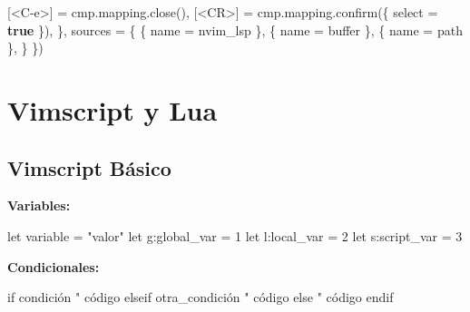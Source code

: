 \documentclass[
  doc,
  floatsintext,
  longtable,
  a4paper,
  nolmodern,
  notxfonts,
  notimes,
  12pt,
  colorlinks=true,linkcolor=blue,citecolor=blue,urlcolor=blue]{apa7}
\newenvironment{Shaded}{\begin{snugshade}}{\end{snugshade}}
\newcommand{\FunctionTok}[1]{\textcolor[rgb]{0.28,0.35,0.67}{#1}}
\newcommand{\KeywordTok}[1]{\textcolor[rgb]{0.00,0.23,0.31}{\textbf{#1}}}
\newcommand{\NormalTok}[1]{\textcolor[rgb]{0.00,0.23,0.31}{#1}}
\newcommand{\OperatorTok}[1]{\textcolor[rgb]{0.37,0.37,0.37}{#1}}
\newcommand{\StringTok}[1]{\textcolor[rgb]{0.13,0.47,0.30}{#1}}
\newcommand{\VariableTok}[1]{\textcolor[rgb]{0.07,0.07,0.07}{#1}}
\begin{document}
\begin{Shaded}
\begin{Highlighting}[]
        \OperatorTok{[}\StringTok{\textquotesingle{}\textless{}C{-}e\textgreater{}\textquotesingle{}}\OperatorTok{]} \OperatorTok{=} \VariableTok{cmp}\OperatorTok{.}\VariableTok{mapping}\OperatorTok{.}\NormalTok{close}\OperatorTok{(),}
        \OperatorTok{[}\StringTok{\textquotesingle{}\textless{}CR\textgreater{}\textquotesingle{}}\OperatorTok{]} \OperatorTok{=} \VariableTok{cmp}\OperatorTok{.}\VariableTok{mapping}\OperatorTok{.}\NormalTok{confirm}\OperatorTok{(\{} \FunctionTok{select} \OperatorTok{=} \KeywordTok{true} \OperatorTok{\}),}
    \OperatorTok{\},}
    \VariableTok{sources} \OperatorTok{=} \OperatorTok{\{}
        \OperatorTok{\{} \VariableTok{name} \OperatorTok{=} \StringTok{\textquotesingle{}nvim\_lsp\textquotesingle{}} \OperatorTok{\},}
        \OperatorTok{\{} \VariableTok{name} \OperatorTok{=} \StringTok{\textquotesingle{}buffer\textquotesingle{}} \OperatorTok{\},}
        \OperatorTok{\{} \VariableTok{name} \OperatorTok{=} \StringTok{\textquotesingle{}path\textquotesingle{}} \OperatorTok{\},}
    \OperatorTok{\}}
\OperatorTok{\})}
\end{Highlighting}
\end{Shaded}

\section{Vimscript y Lua}\label{vimscript-y-lua}

\subsection{Vimscript Básico}\label{vimscript-buxe1sico}

\textbf{Variables:}

\begin{Shaded}
\begin{Highlighting}[]
\NormalTok{let variable = "valor"}
\NormalTok{let g:global\_var = 1}
\NormalTok{let l:local\_var = 2}
\NormalTok{let s:script\_var = 3}
\end{Highlighting}
\end{Shaded}

\textbf{Condicionales:}

\begin{Shaded}
\begin{Highlighting}[]
\NormalTok{if condición}
\NormalTok{    " código}
\NormalTok{elseif otra\_condición}
\NormalTok{    " código}
\NormalTok{else}
\NormalTok{    " código}
\NormalTok{endif}
\end{Highlighting}
\end{Shaded}
\end{document}
